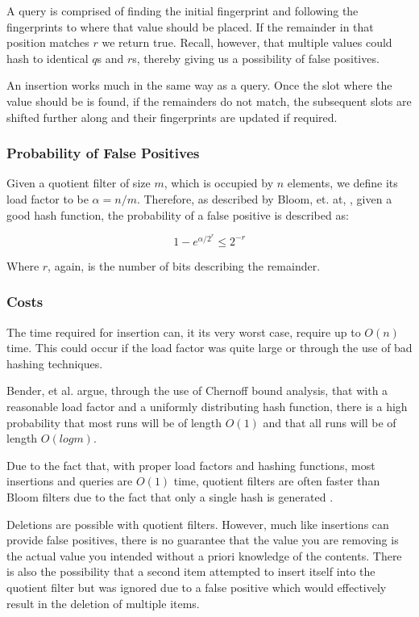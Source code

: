 \documentclass[twoside]{article}
\begin{document}
A query is comprised of finding the initial fingerprint and following the fingerprints to where that value should be placed. If the remainder in that position matches $r$ we return true. Recall, however, that multiple values could hash to identical $q$s and $r$s, thereby giving us a possibility of false positives.

An insertion works much in the same way as a query. Once the slot where the value should be is found, if the remainders do not match, the subsequent slots are shifted further along and their fingerprints are updated if required.

\subsubsection{Probability of False Positives}

Given a quotient filter of size $m$, which is occupied by $n$ elements, we define its load factor to be $\alpha = n/m$. Therefore, as described by Bloom, et. at, \cite{bender}, given a good hash function, the probability of a false positive is described as:

\begin{equation}
1 - e^{\alpha/2^r} \leq 2^{-r}
\end{equation}

Where $r$, again, is the number of bits describing the remainder.

\subsubsection{Costs}

The time required for insertion can, it its very worst case, require up to $O(n)$ time. This could occur if the load factor was quite large or through the use of bad hashing techniques.

Bender, et al.\cite{bender} argue, through the use of Chernoff bound analysis, that with a reasonable load factor and a uniformly distributing hash function, there is a high probability that most runs will be of length $O(1)$ and that all runs will be of length $O(logm)$.

Due to the fact that, with proper load factors and hashing functions, most insertions and queries are $O(1)$ time, quotient filters are often faster than Bloom filters due to the fact that only a single hash is generated \cite{spillane}.

Deletions are possible with quotient filters. However, much like insertions can provide false positives, there is no guarantee that the value you are removing is the actual value you intended without a priori knowledge of the contents. There is also the possibility that a second item attempted to insert itself into the quotient filter but was ignored due to a false positive which would effectively result in the deletion of multiple items.
\end{document}
